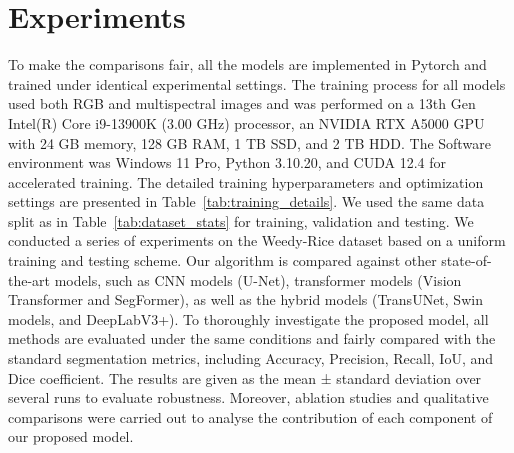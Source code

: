 \documentclass[pdflatex,sn-mathphys-num]{sn-jnl}
\begin{document}
\section{Experiments}
To make the comparisons fair, all the models are implemented in Pytorch and trained under identical experimental settings. The training process for all models used both RGB and multispectral images and was performed on a 13th Gen Intel(R) Core i9-13900K (3.00 GHz) processor, an NVIDIA RTX A5000 GPU with 24 GB memory, 128 GB RAM, 1 TB SSD, and 2 TB HDD. The Software environment was Windows 11 Pro, Python 3.10.20, and CUDA 12.4 for accelerated training. The detailed training hyperparameters and optimization settings are presented in Table~\ref{tab:training_details}. We used the same data split as in Table~\ref{tab:dataset_stats} for training, validation and testing. We conducted a series of experiments on the Weedy-Rice dataset based on a uniform training and testing scheme. Our algorithm is compared against other state-of-the-art models, such as CNN models (U-Net), transformer models (Vision Transformer and SegFormer), as well as the hybrid models (TransUNet, Swin models, and DeepLabV3+). To thoroughly investigate the proposed model, all methods are evaluated under the same conditions and fairly compared with the standard segmentation metrics, including Accuracy, Precision, Recall, IoU, and Dice coefficient. The results are given as the mean ± standard deviation over several runs to evaluate robustness. Moreover, ablation studies and qualitative comparisons were carried out to analyse the contribution of each component of our proposed model.
\end{document}
